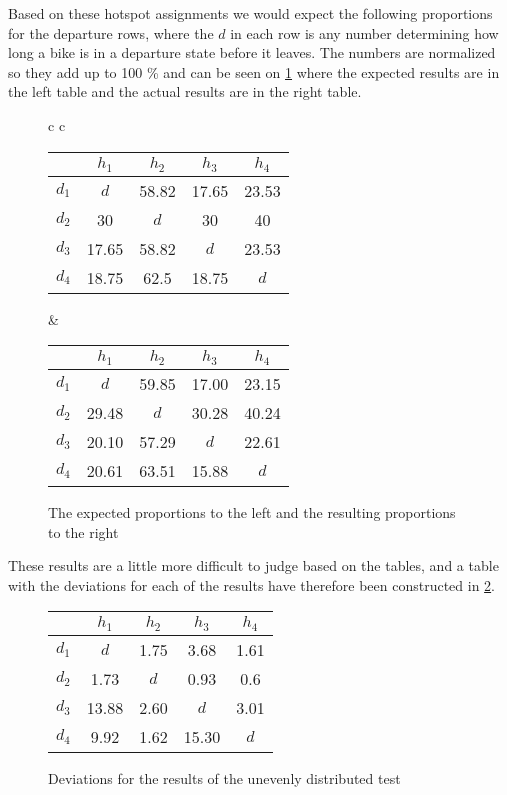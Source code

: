 Based on these hotspot assignments we would expect the following proportions for the departure rows, where the $ d $ in each row is any number determining how long a bike is in a departure state before it leaves.
The numbers are normalized so they add up to 100 \% and can be seen on \cref{uneven_results} where the expected results are in the left table and the actual results are in the right table.

\begin{figure}

\begin{tabular} {c c }

\begin{tabular}{ | c | c c c c |}
	\hline
	 & $ h_1 $ & $ h_2 $ & $ h_3 $ & $ h_4 $\\
	\hline
	$ d_1 $ & $ d $ & 58.82 & 17.65 & 23.53\\
	$ d_2 $ & 30 & $ d $ & 30 & 40\\
	$ d_3 $ & 17.65 & 58.82 & $ d $ & 23.53\\
	$ d_4 $ & 18.75 & 62.5 & 18.75 & $ d $\\
	\hline
\end{tabular}

&

\begin{tabular}{ | c | c c c c |}
	\hline
	& $ h_1 $ & $ h_2 $ & $ h_3 $ & $ h_4 $\\
	\hline
	$ d_1 $ & $ d $ & 59.85 & 17.00 & 23.15\\
	$ d_2 $ & 29.48 & $ d $ & 30.28 & 40.24\\
	$ d_3 $ & 20.10 & 57.29 & $ d $ & 22.61 \\
	$ d_4 $ & 20.61 & 63.51 & 15.88 & $ d $\\
	\hline
\end{tabular}
\end{tabular}
\caption{The expected proportions to the left and the resulting proportions to the right}\label{uneven_results}
\end{figure}

These results are a little more difficult to judge based on the tables, and a table with the deviations for each of the results have therefore been constructed in \cref{deviations}.

\begin{figure}
	\centering
	\begin{tabular}{ | c | c c c c |}
	\hline
	& $ h_1 $ & $ h_2 $ & $ h_3 $ & $ h_4 $\\
	\hline
	$ d_1 $ & $ d $ & 1.75 & 3.68 & 1.61\\
	$ d_2 $ & 1.73 & $ d $ & 0.93 & 0.6\\
	$ d_3 $ & 13.88 & 2.60 & $ d $ & 3.01 \\
	$ d_4 $ & 9.92 & 1.62 & 15.30 & $ d $\\
	\hline
\end{tabular}
\caption{Deviations for the results of the unevenly distributed test} \label{deviations}
\end{figure}

